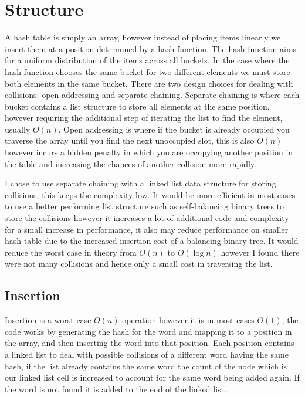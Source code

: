 \documentclass[12pt]{article}
\begin{document}
\section{Structure}
A hash table is simply an array, however instead of placing items linearly we insert them at a position determined by a hash function. The hash function aims for a uniform distribution of the items across all buckets. In the case where the hash function chooses the same bucket for two different elements we must store both elements in the same bucket. There are two design choices for dealing with collisions: open addressing and separate chaining. Separate chaining is where each bucket contains a list structure to store all elements at the same position, however requiring the additional step of iterating the list to find the element, usually $O(n)$. Open addressing is where if the bucket is already occupied you traverse the array until you find the next unoccupied slot, this is also $O(n)$ however incurs a hidden penalty in which you are occupying another position in the table and increasing the chances of another collision more rapidly.

I chose to use separate chaining with a linked list data structure for storing collisions, this keeps the complexity low. It would be more efficient in most cases to use a better performing list structure such as self-balancing binary trees to store the collisions however it increases a lot of additional code and complexity for a small increase in performance, it also may reduce performance on smaller hash table due to the increased insertion cost of a balancing binary tree. It would reduce the worst case in theory from $O(n)$ to $O(\log{}n)$ however I found there were not many collisions and hence only a small cost in traversing the list.

\subsection{Insertion}
Insertion is a worst-case $O(n)$ operation however it is in most cases $O(1)$, the code works by generating the hash for the word and mapping it to a position in the array, and then inserting the word into that position. Each position contains a linked list to deal with possible collisions of a different word having the same hash, if the list already contains the same word the count of the node which is our linked list cell is increased to account for the same word being added again. If the word is not found it is added to the end of the linked list.
\end{document}
